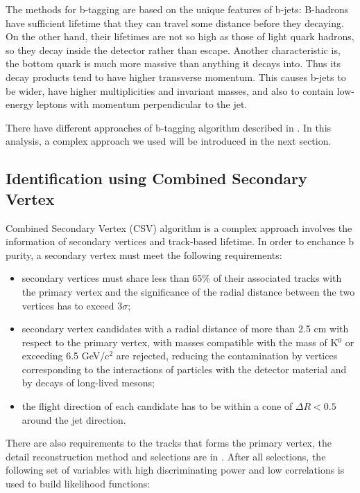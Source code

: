 The methods for b-tagging are based on the unique features of b-jets: B-hadrons have sufficient lifetime that they can travel some distance before they decaying. On the other hand, their lifetimes are not so high as those of light quark hadrons, so they decay inside the detector rather than escape. Another characteristic is, the bottom quark is much more massive than anything it decays into. Thus its decay products tend to have higher transverse momentum. This causes b-jets to be wider, have higher multiplicities and invariant masses, and also to contain low-energy leptons with momentum perpendicular to the jet.

There have different approaches of b-tagging algorithm described in \cite{btagAlgo}. In this analysis, a complex approach we used will be introduced in the next section.

\subsection*{Identification using Combined Secondary Vertex}

Combined Secondary Vertex (CSV) algorithm is a complex approach involves the information of secondary vertices and track-based lifetime. In order to enchance b purity, a secondary vertex must meet the following requirements:

\begin{itemize}
\item secondary vertices must share less than 65\% of their associated tracks with the primary vertex and the significance of the radial distance between the two vertices has to exceed 3$\sigma$;
\item secondary vertex candidates with a radial distance of more than 2.5 cm with respect to the primary vertex, with masses compatible with the mass of K$^{0}$ or exceeding 6.5 GeV/c$^{2}$ are rejected, reducing the contamination by vertices corresponding to the interactions of particles with the detector material and by decays of long-lived mesons;
\item the flight direction of each candidate has to be within a cone of $\Delta R < 0.5$ around the jet direction.
\end{itemize}

There are also requirements to the tracks that forms the primary vertex, the detail reconstruction method and selections are in \cite{btagAlgo}. After all selections, the following set of variables with high discriminating power and low correlations is used to build likelihood functions:

